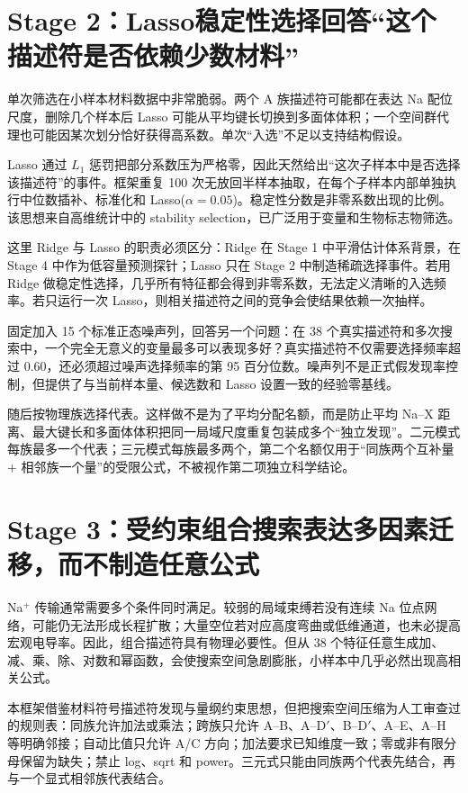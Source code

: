 \section{Stage 2：Lasso稳定性选择回答“这个描述符是否依赖少数材料”}

单次筛选在小样本材料数据中非常脆弱。两个 A 族描述符可能都在表达 Na 配位尺度，删除几个样本后 Lasso 可能从平均键长切换到多面体体积；一个空间群代理也可能因某次划分恰好获得高系数。单次“入选”不足以支持结构假设。

Lasso 通过 $L_1$ 惩罚把部分系数压为严格零，因此天然给出“这次子样本中是否选择该描述符”的事件\cite{Tibshirani1996}。框架重复 100 次无放回半样本抽取，在每个子样本内部单独执行中位数插补、标准化和 Lasso($\alpha=0.05$)。稳定性分数是非零系数出现的比例。该思想来自高维统计中的 stability selection，已广泛用于变量和生物标志物筛选\cite{Meinshausen2010}。

这里 Ridge 与 Lasso 的职责必须区分：Ridge 在 Stage 1 中平滑估计体系背景，在 Stage 4 中作为低容量预测探针；Lasso 只在 Stage 2 中制造稀疏选择事件。若用 Ridge 做稳定性选择，几乎所有特征都会得到非零系数，无法定义清晰的入选频率。若只运行一次 Lasso，则相关描述符之间的竞争会使结果依赖一次抽样。

固定加入 15 个标准正态噪声列，回答另一个问题：在 38 个真实描述符和多次搜索中，一个完全无意义的变量最多可以表现多好？真实描述符不仅需要选择频率超过 0.60，还必须超过噪声选择频率的第 95 百分位数。噪声列不是正式假发现率控制，但提供了与当前样本量、候选数和 Lasso 设置一致的经验零基线。

随后按物理族选择代表。这样做不是为了平均分配名额，而是防止平均 Na--X 距离、最大键长和多面体体积把同一局域尺度重复包装成多个“独立发现”。二元模式每族最多一个代表；三元模式每族最多两个，第二个名额仅用于“同族两个互补量 + 相邻族一个量”的受限公式，不被视作第二项独立科学结论。

\section{Stage 3：受约束组合搜索表达多因素迁移，而不制造任意公式}

Na$^+$ 传输通常需要多个条件同时满足。较弱的局域束缚若没有连续 Na 位点网络，可能仍无法形成长程扩散；大量空位若对应高度弯曲或低维通道，也未必提高宏观电导率。因此，组合描述符具有物理必要性。但从 38 个特征任意生成加、减、乘、除、对数和幂函数，会使搜索空间急剧膨胀，小样本中几乎必然出现高相关公式。

本框架借鉴材料符号描述符发现与量纲约束思想\cite{Ouyang2018}，但把搜索空间压缩为人工审查过的规则表：同族允许加法或乘法；跨族只允许 A--B、A--D$'$、B--D$'$、A--E、A--H 等明确邻接；自动比值只允许 A/C 方向；加法要求已知维度一致；零或非有限分母保留为缺失；禁止 log、sqrt 和 power。三元式只能由同族两个代表先结合，再与一个显式相邻族代表结合。

